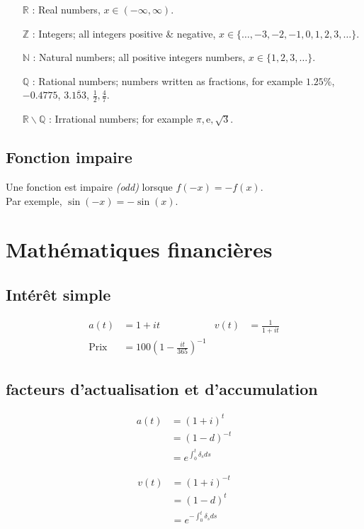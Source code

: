 \documentclass[10pt, french]{article}
\begin{document}
\begin{multicols*}{2}
\begin{definitionNOHFILL}[Domaines]
\begin{itemize}
	\item[$\mathds{R}$]: Real numbers, $x \in (-\infty, \infty)$.
	\item[$\mathds{Z}$]: Integers; all integers positive \& negative, $x \in \{\dots, -3, -2, -1, 0, 1, 2, 3, \dots\}$.
	\item[$\mathds{N}$]: Natural numbers; all positive integers numbers, $x \in \{1, 2, 3, \dots\}$.
	\item[$\mathds{Q}$]: Rational numbers; numbers written as fractions, for example $1.25\%$, $-0.4775$, $3.\overline{153}$, $\frac{1}{2}, \frac{4}{7}$.	
	\item[$\mathds{R} \backslash \mathds{Q}$]: Irrational numbers; for example $\pi, \mathrm{e}, \sqrt{3}$.
\end{itemize}
\end{definitionNOHFILL}

\subsection*{Fonction impaire}

Une fonction est impaire \textit{(odd)} lorsque $f(-x) = -f(x)$.\\
Par exemple, $\sin(-x) = -\sin(x)$.

\newpage

\section*{Mathématiques financières}

\subsection*{Intérêt simple}
\begin{align*}
	a(t)
		&=	1 + it &
	v(t)
		&=	\frac{1}{1 + it} \\
	\text{Prix}
		&=	100 \left( 1 - \frac{it}{365} \right)^{-1}
\end{align*}

\subsection*{facteurs d'actualisation et d'accumulation}
\begin{minipage}[t]{.5\linewidth}
\begin{align*}
	a(t) 
		&= 	(1 + i)^{t} 		\\
		&= 	(1 - d)^{-t}	\\
		&= 	e^{\int_{0}^{t} \delta_s ds} 
\end{align*}
\end{minipage}
\begin{minipage}[t]{.5\linewidth}
	\begin{align*}
	v(t) 
		&=	(1 + i)^{-t}		\\
		&=	(1 - d)^{t}	 	\\
		&= 	e^{-\int_{0}^{t} \delta_s ds} 
\end{align*}
\end{minipage}


\end{multicols*}
\end{document}
